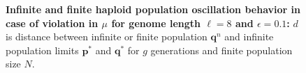 \begin{figure}[H]
\begin{center}
\hspace{5pt}
\hspace{5pt}


\caption{\textbf{Infinite and finite haploid population oscillation behavior in case of violation in $\mu$ for genome length $\ell = 8$ and $\epsilon = 0.1$:} $d$ is
  distance between infinite or finite population ${\bm q}^n$ and infinite
  population limits ${{\bm p}^\ast}$ and ${{\bm q}^{\ast}}$ for $g$ generations and finite population size $N$.}
\label{oscillation_8h_vio_mu_0.1}
\end{center}
\end{figure}

